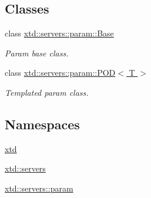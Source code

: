 \subsection*{Classes}
\begin{DoxyCompactItemize}
\item 
class \hyperlink{classxtd_1_1servers_1_1param_1_1Base}{xtd\-::servers\-::param\-::\-Base}
\begin{DoxyCompactList}\small\item\em Param base class. \end{DoxyCompactList}\item 
class \hyperlink{classxtd_1_1servers_1_1param_1_1POD}{xtd\-::servers\-::param\-::\-P\-O\-D$<$ T $>$}
\begin{DoxyCompactList}\small\item\em Templated param class. \end{DoxyCompactList}\end{DoxyCompactItemize}
\subsection*{Namespaces}
\begin{DoxyCompactItemize}
\item 
\hyperlink{namespacextd}{xtd}
\item 
\hyperlink{namespacextd_1_1servers}{xtd\-::servers}
\item 
\hyperlink{namespacextd_1_1servers_1_1param}{xtd\-::servers\-::param}
\end{DoxyCompactItemize}
